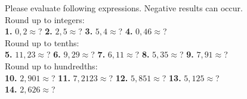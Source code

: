 \documentclass[a4paper]{article}
\begin{document}
\begin{Large}

Please evaluate following expressions. Negative results can occur. \\[0.75cm]

Round up to integers: \\[0.75cm]

\textbf{1.} $0,2 \approx$? \hspace{0.3cm}
\textbf{2.} $2,5 \approx$? \hspace{0.3cm}
\textbf{3.} $5,4 \approx$? \hspace{0.3cm}
\textbf{4.} $0,46 \approx$? \\[0.75cm]

Round up to tenths: \\[0.75cm]

\textbf{5.} $11,23 \approx$? \hspace{0.3cm}
\textbf{6.} $9,29 \approx$? \hspace{0.3cm}
\textbf{7.} $6,11 \approx$? \hspace{0.3cm}
\textbf{8.} $5,35 \approx$? \hspace{0.3cm}
\textbf{9.} $7,91 \approx$? \\[0.75cm]
	
Round up to hundredths: \\[0.75cm]

\textbf{10.} $2,901 \approx$? \hspace{0.3cm}
\textbf{11.} $7,2123 \approx$? \hspace{0.3cm}
\textbf{12.} $5,851 \approx$? \hspace{0.3cm}
\textbf{13.} $5,125 \approx$? \\[0.75cm]
\textbf{14.} $2,626 \approx$? \hspace{0.3cm}

\end{Large}
\end{document}
